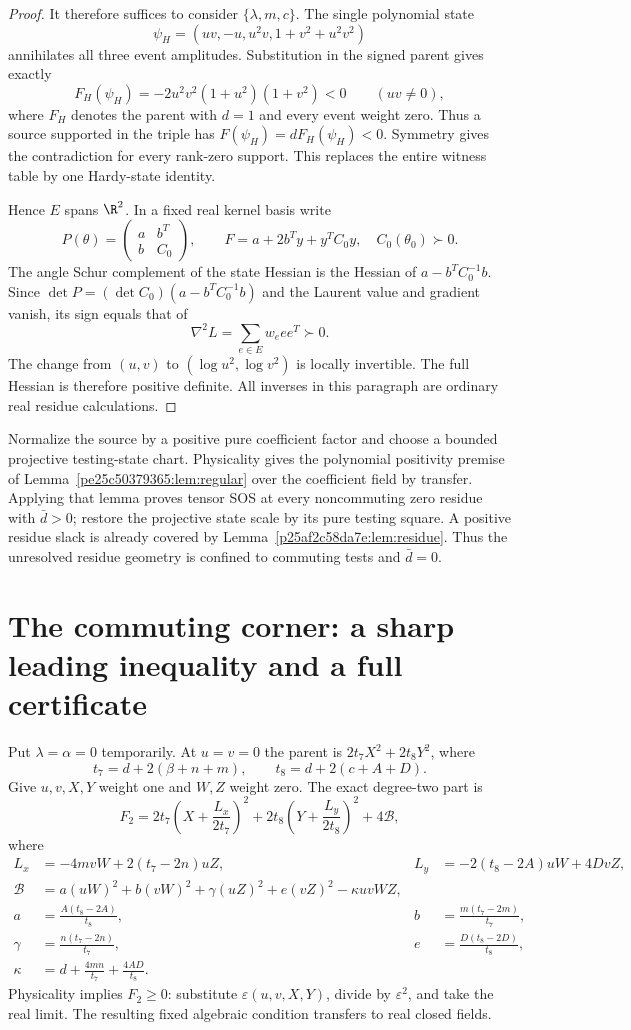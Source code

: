 \begin{proof}
It therefore suffices to consider $\{\lambda,m,c\}$. The single polynomial state
\[
\psi_H=(uv,-u,u^2v,1+v^2+u^2v^2)
\]
annihilates all three event amplitudes. Substitution in the signed parent gives exactly
\[
F_H(\psi_H)=-2u^2v^2(1+u^2)(1+v^2)<0\qquad(uv\ne0),
\]
where $F_H$ denotes the parent with $d=1$ and every event weight zero. Thus a source supported in the triple has $F(\psi_H)=dF_H(\psi_H)<0$. Symmetry gives the contradiction for every rank-zero support. This replaces the entire witness table by one Hardy-state identity.

Hence $E$ spans $\R^2$. In a fixed real kernel basis write
\[
P(\theta)=\begin{pmatrix}a&b^T\\b&C_0\end{pmatrix},\qquad
F=a+2b^Ty+y^TC_0y,\quad C_0(\theta_0)\succ0.
\]
The angle Schur complement of the state Hessian is the Hessian of $a-b^TC_0^{-1}b$. Since $\det P=(\det C_0)(a-b^TC_0^{-1}b)$ and the Laurent value and gradient vanish, its sign equals that of
\[
\nabla^2L=\sum_{e\in E}w_e ee^T\succ0.
\]
The change from $(u,v)$ to $(\log u^2,\log v^2)$ is locally invertible. The full Hessian is therefore positive definite. All inverses in this paragraph are ordinary real residue calculations.
\end{proof}

Normalize the source by a positive pure coefficient factor and choose a bounded projective testing-state chart. Physicality gives the polynomial positivity premise of Lemma~\ref{pe25c50379365:lem:regular} over the coefficient field by transfer. Applying that lemma proves tensor SOS at every noncommuting zero residue with $\bar d>0$; restore the projective state scale by its pure testing square. A positive residue slack is already covered by Lemma~\ref{p25af2c58da7e:lem:residue}. Thus the unresolved residue geometry is confined to commuting tests and $\bar d=0$.

\section{The commuting corner: a sharp leading inequality and a full certificate}\label{pe25c50379365:sec:corner}
Put $\lambda=\alpha=0$ temporarily. At $u=v=0$ the parent is $2t_7X^2+2t_8Y^2$, where
\[
t_7=d+2(\beta+n+m),\qquad t_8=d+2(c+A+D).
\]
Give $u,v,X,Y$ weight one and $W,Z$ weight zero. The exact degree-two part is
\[
F_2=2t_7\left(X+\frac{L_x}{2t_7}\right)^2
+2t_8\left(Y+\frac{L_y}{2t_8}\right)^2+4\mathcal B,
\]
where
\begin{align*}
L_x&=-4mvW+2(t_7-2n)uZ,&
L_y&=-2(t_8-2A)uW+4DvZ,\\
\mathcal B&=a(uW)^2+b(vW)^2+\gamma(uZ)^2+e(vZ)^2-\kappa uvWZ,\\
a&=\frac{A(t_8-2A)}{t_8},&b&=\frac{m(t_7-2m)}{t_7},\\
\gamma&=\frac{n(t_7-2n)}{t_7},&e&=\frac{D(t_8-2D)}{t_8},\\
\kappa&=d+\frac{4mn}{t_7}+\frac{4AD}{t_8}.&&
\end{align*}
Physicality implies $F_2\ge0$: substitute $\varepsilon(u,v,X,Y)$, divide by $\varepsilon^2$, and take the real limit. The resulting fixed algebraic condition transfers to real closed fields.

